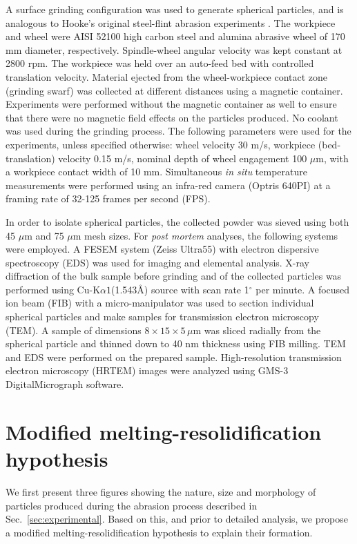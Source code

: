 \documentclass[11pt]{article}
\begin{document}
A surface grinding configuration was used to generate spherical particles, and is analogous to Hooke's original steel-flint abrasion experiments \cite{Shaw2005}. The workpiece and wheel were AISI 52100 high carbon steel and alumina abrasive wheel of 170 mm diameter, respectively. Spindle-wheel angular velocity was kept constant at 2800 rpm. The workpiece was held over an auto-feed bed with controlled translation velocity. Material ejected from the wheel-workpiece contact zone (grinding swarf) was collected at different distances using a magnetic container. Experiments were performed without the magnetic container as well to ensure that there were no magnetic field effects on the particles produced. No coolant was used during the grinding process. The following parameters were used for the experiments, unless specified otherwise: wheel velocity 30 m/s, workpiece (bed-translation) velocity 0.15 m/s, nominal depth of wheel engagement 100 $\mu$m, with a workpiece contact width of 10 mm. Simultaneous \emph{in situ} temperature measurements were performed using an infra-red camera (Optris 640PI) at a framing rate of 32-125 frames per second (FPS). 

In order to isolate spherical particles, the collected powder was sieved using both 45 $\mu$m and 75 $\mu$m mesh sizes. For \emph{post mortem} analyses, the following systems were employed. A FESEM system (Zeiss Ultra55) with electron dispersive spectroscopy (EDS) was used for imaging and elemental analysis. X-ray diffraction of the bulk sample before grinding and of the collected particles was performed using Cu-K$\alpha1$(1.543\AA) source with scan rate 1$^\circ$ per minute. A focused ion beam (FIB) with a micro-manipulator was used to section individual spherical particles and make samples for transmission electron microscopy (TEM). A sample of dimensions $8\times 15\times 5 \,\mu$m was sliced radially from the spherical particle and thinned down to 40 nm thickness using FIB milling. TEM and EDS were performed on the prepared sample. High-resolution transmission electron microscopy (HRTEM) images were analyzed using GMS-3 DigitalMicrograph software.


\section{Modified melting-resolidification hypothesis}
\label{sec:hypothesis}

We first present three figures showing the nature, size and morphology of particles produced during the abrasion process described in Sec.~\ref{sec:experimental}. Based on this, and prior to detailed analysis, we propose a modified melting-resolidification hypothesis to explain their formation.
\end{document}
